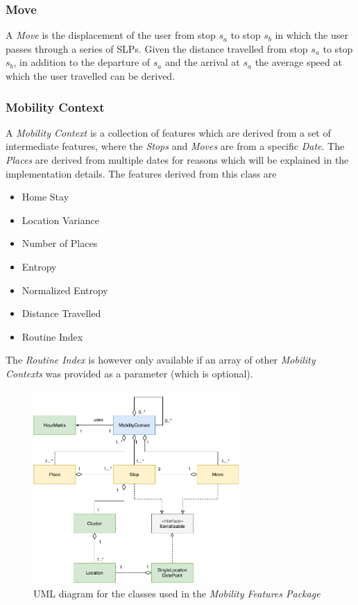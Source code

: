 \subsubsection*{Move}
A \textit{Move} is the displacement of the user from stop $s_a$ to stop $s_b$ in which the user passes through a series of SLPs. Given the distance travelled from stop $s_a$ to stop $s_b$, in addition to the departure of $s_a$ and the arrival at $s_a$ the average speed at which the user travelled can be derived. 

\subsubsection*{Mobility Context}
A \textit{Mobility Context} is a collection of features which are derived from a set of intermediate features, where the \textit{Stops} and \textit{Moves} are from a specific \textit{Date}. The \textit{Places} are derived from multiple dates for reasons which will be explained in the implementation details. The features derived from this class are

\begin{itemize}
  \setlength\itemsep{0.5em}
    \item Home Stay
    \item Location Variance
    \item Number of Places
    \item Entropy
    \item Normalized Entropy
    \item Distance Travelled
    \item Routine Index
\end{itemize}

The \textit{Routine Index} is however only available if an array of other \textit{Mobility Contexts} was provided as a parameter (which is optional).

\begin{figure}[h]
    \centering
    \includegraphics[width=0.7\textwidth]{./images/uml-mobility.pdf}
    \caption{UML diagram for the classes used in the \textit{Mobility Features Package}}
    \label{fig:my_label}
\end{figure}



